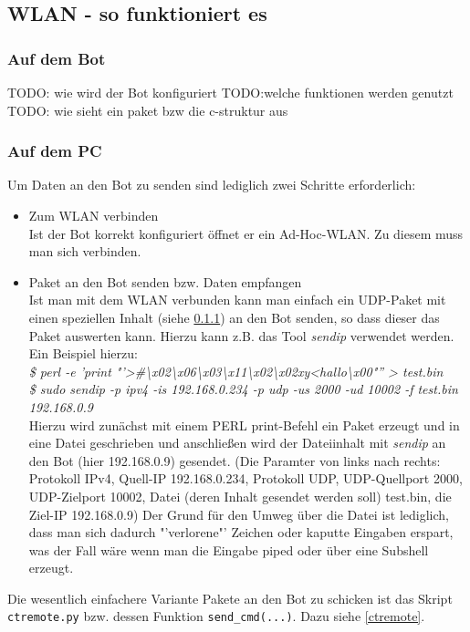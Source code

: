 \subsection{WLAN - so funktioniert es}
\label{wlan}

\subsubsection{Auf dem Bot}
\label{wlan_auf_bot}
TODO: wie wird der Bot konfiguriert
TODO:welche funktionen werden genutzt
TODO: wie sieht ein paket bzw die c-struktur aus

\subsubsection{Auf dem PC}
Um Daten an den Bot zu senden sind lediglich zwei Schritte erforderlich:
\begin{itemize}
	\item Zum WLAN verbinden\\
	Ist der Bot korrekt konfiguriert öffnet er ein Ad-Hoc-WLAN. Zu diesem muss man sich verbinden.
	\item Paket an den Bot senden bzw. Daten empfangen\\
	Ist man mit dem WLAN verbunden kann man einfach ein UDP-Paket mit einen speziellen Inhalt (siehe \ref{wlan_auf_bot}) an den Bot senden, so dass dieser das Paket auswerten kann.
	Hierzu kann z.B. das Tool \textit{sendip} verwendet werden. Ein Beispiel hierzu:\\
	\textit{\$ perl -e 'print "'>#\textbackslash x02\textbackslash x06\textbackslash x03\textbackslash x11\textbackslash x02\textbackslash x02xy<hallo\textbackslash x00"'' > test.bin\\
	\$ sudo sendip -p ipv4 -is 192.168.0.234 -p udp -us 2000 -ud 10002 -f test.bin 192.168.0.9}\\
	Hierzu wird zunächst mit einem PERL print-Befehl ein Paket erzeugt und in eine Datei geschrieben und anschließen wird der Dateiinhalt mit \textit{sendip} an den Bot (hier 192.168.0.9) gesendet.
	(Die Paramter von links nach rechts: Protokoll IPv4, Quell-IP 192.168.0.234, Protokoll UDP, UDP-Quellport 2000, UDP-Zielport 10002, Datei (deren Inhalt gesendet werden soll) test.bin, die Ziel-IP 192.168.0.9)
	Der Grund für den Umweg über die Datei ist lediglich, dass man sich dadurch "'verlorene"' Zeichen oder kaputte Eingaben erspart, was der Fall wäre wenn man die Eingabe piped oder über eine Subshell erzeugt.
\end{itemize}
Die wesentlich einfachere Variante Pakete an den Bot zu schicken ist das Skript \verb+ctremote.py+ bzw. dessen Funktion \verb+send_cmd(...)+. Dazu siehe \ref{ctremote}.

